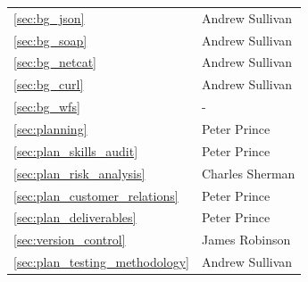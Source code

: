 \documentclass[a4paper, 12pt, twoside]{article}
\newcommand*{\fullref}[1]{\ref{#1} \nameref{#1}}
\begin{document}
\begin{tabularx}{\textwidth}{|X|X|}
  \fullref{sec:bg_json}                  & Andrew Sullivan                    \\
  \fullref{sec:bg_soap}                  & Andrew Sullivan                    \\
  \fullref{sec:bg_netcat}                & Andrew Sullivan                    \\
  \fullref{sec:bg_curl}                  & Andrew Sullivan                    \\
  \fullref{sec:bg_wfs}                   & -                                  \\ \hline
  \fullref{sec:planning}                 & Peter Prince                       \\
  \fullref{sec:plan_skills_audit}        & Peter Prince                       \\
  \fullref{sec:plan_risk_analysis}       & Charles Sherman                    \\
  \fullref{sec:plan_customer_relations}  & Peter Prince                       \\
  \fullref{sec:plan_deliverables}        & Peter Prince    \\
  \fullref{sec:version_control}          & James Robinson                     \\
  \fullref{sec:plan_testing_methodology} & Andrew Sullivan                    \\ \hline
\end{tabularx}
\newpage
\end{document}
